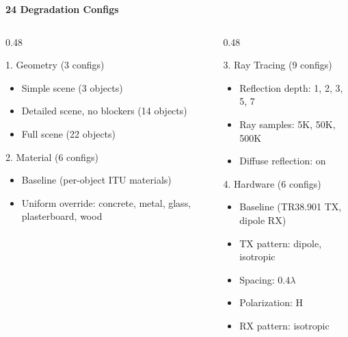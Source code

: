 \documentclass[
    aspectratio=169
]{beamer}
\begin{document}
\begin{frame}{\textbf{24 Degradation Configs}}
\vspace{-0.1cm}
\begin{columns}[T]
\begin{column}{0.48\textwidth}
\begin{block}{1. Geometry (3 configs)}
\begin{itemize}
    \item Simple scene (3 objects)
    \item Detailed scene, no blockers (14 objects)
    \item Full scene (22 objects)
\end{itemize}
\end{block}
\begin{block}{2. Material (6 configs)}
\begin{itemize}
    \item Baseline (per-object ITU materials)
    \item Uniform override: concrete, metal, glass, plasterboard, wood
\end{itemize}
\end{block}
\end{column}
\begin{column}{0.48\textwidth}
\begin{block}{3. Ray Tracing (9 configs)}
\begin{itemize}
    \item Reflection depth: 1, 2, 3, 5, 7
    \item Ray samples: 5K, 50K, 500K
    \item Diffuse reflection: on
\end{itemize}
\end{block}
\begin{block}{4. Hardware (6 configs)}
\begin{itemize}
    \item Baseline (TR38.901 TX, dipole RX)
    \item TX pattern: dipole, isotropic
    \item Spacing: $0.4\lambda$
    \item Polarization: H
    \item RX pattern: isotropic
\end{itemize}
\end{block}
\end{column}
\end{columns}
\end{frame}
\end{document}
